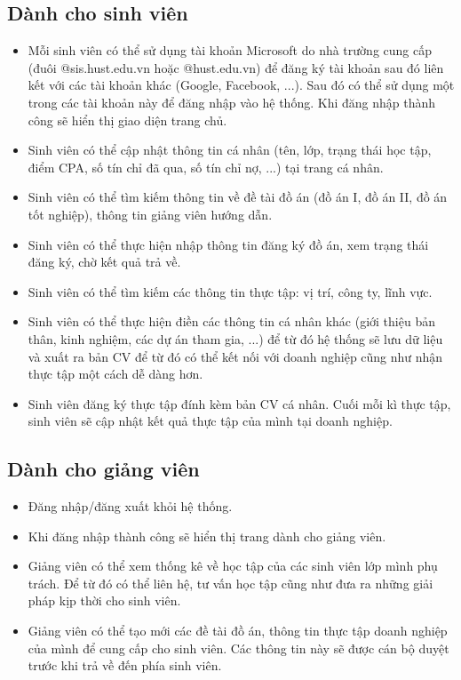 \subsection{Dành cho sinh viên}
\begin{itemize}
	\item Mỗi sinh viên có thể sử dụng tài khoản Microsoft do nhà trường cung cấp (đuôi @sis.hust.edu.vn hoặc @hust.edu.vn) để đăng ký tài khoản sau đó liên kết với các tài khoản khác (Google, Facebook, ...). Sau đó có thể sử dụng một trong các tài khoản này để đăng nhập vào hệ thống. Khi đăng nhập thành công sẽ hiển thị giao diện trang chủ.
	\item Sinh viên có thể cập nhật thông tin cá nhân (tên, lớp, trạng thái học tập, điểm CPA, số tín chỉ đã qua, số tín chỉ nợ, ...) tại trang cá nhân.
	\item Sinh viên có thể tìm kiếm thông tin về đề tài đồ án (đồ án I, đồ án II, đồ án tốt nghiệp), thông tin giảng viên hướng dẫn.
	\item Sinh viên có thể thực hiện nhập thông tin đăng ký đồ án, xem trạng thái đăng ký, chờ kết quả trả về.
	\item Sinh viên có thể tìm kiếm các thông tin thực tập: vị trí, công ty, lĩnh vực.
	\item Sinh viên có thể thực hiện điền các thông tin cá nhân khác (giới thiệu bản thân, kinh nghiệm, các dự án tham gia, ...) để từ đó hệ thống sẽ lưu dữ liệu và xuất ra bản CV để từ đó có thể kết nối với doanh nghiệp cũng như nhận thực tập một cách dễ dàng hơn.
	\item Sinh viên đăng ký thực tập đính kèm bản CV cá nhân. Cuối mỗi kì thực tập, sinh viên sẽ cập nhật kết quả thực tập của mình tại doanh nghiệp.
\end{itemize}
\subsection{Dành cho giảng viên}
\begin{itemize}
	\item Đăng nhập/đăng xuất khỏi hệ thống.
	\item Khi đăng nhập thành công sẽ hiển thị trang dành cho giảng viên.
	\item Giảng viên có thể xem thống kê về học tập của các sinh viên lớp mình phụ trách. Để từ đó có thể liên hệ, tư vấn học tập cũng như đưa ra những giải pháp kịp thời cho sinh viên.
	\item Giảng viên có thể tạo mới các đề tài đồ án, thông tin thực tập doanh nghiệp của mình để cung cấp cho sinh viên. Các thông tin này sẽ được cán bộ duyệt trước khi trả về đến phía sinh viên.
\end{itemize}
